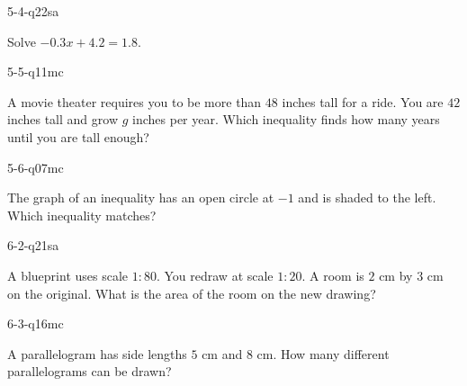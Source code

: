 \begin{practiceQuestion}{5-4-q22}{sa}
\begin{questionText}
Solve $-0.3x + 4.2 = 1.8$.
\end{questionText}
\end{practiceQuestion}

\begin{practiceQuestion}{5-5-q11}{mc}
\begin{questionText}
A movie theater requires you to be more than $48$ inches tall for a ride. You are $42$ inches tall and grow $g$ inches per year. Which inequality finds how many years until you are tall enough?
\end{questionText}
\end{practiceQuestion}

\begin{practiceQuestion}{5-6-q07}{mc}
\begin{questionText}
The graph of an inequality has an open circle at $-1$ and is shaded to the left. Which inequality matches?
\end{questionText}
\end{practiceQuestion}

\begin{practiceQuestion}{6-2-q21}{sa}
\begin{questionText}
A blueprint uses scale $1:80$. You redraw at scale $1:20$. A room is $2$ cm by $3$ cm on the original. What is the area of the room on the new drawing?
\end{questionText}
\end{practiceQuestion}

\begin{practiceQuestion}{6-3-q16}{mc}
\begin{questionText}
A parallelogram has side lengths $5$ cm and $8$ cm. How many different parallelograms can be drawn?
\end{questionText}
\end{practiceQuestion}

